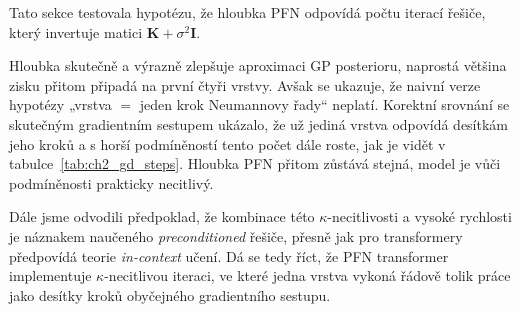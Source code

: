 Tato sekce testovala hypotézu, že hloubka PFN odpovídá počtu iterací řešiče, který invertuje matici $\mathbf{K} + \sigma^2 \mathbf{I}$.
\par

Hloubka skutečně a výrazně zlepšuje aproximaci GP posterioru, naprostá většina zisku přitom připadá na první čtyři vrstvy.
Avšak se ukazuje, že naivní verze hypotézy „vrstva $=$ jeden krok Neumannovy řady“ neplatí.
Korektní srovnání se skutečným gradientním sestupem ukázalo, že už jediná vrstva odpovídá desítkám jeho kroků a s horší podmíněností tento počet dále roste, jak je vidět v tabulce~\ref{tab:ch2_gd_steps}.
Hloubka PFN přitom zůstává stejná, model je vůči podmíněnosti prakticky necitlivý.
\par

Dále jsme odvodili předpoklad, že kombinace této $\kappa$-necitlivosti a vysoké rychlosti je náznakem naučeného \emph{preconditioned} řešiče, přesně jak pro transformery předpovídá teorie \emph{in-context} učení.
Dá se tedy říct, že PFN transformer implementuje $\kappa$-necitlivou iteraci, ve které jedna vrstva vykoná řádově tolik práce jako desítky kroků obyčejného gradientního sestupu.
